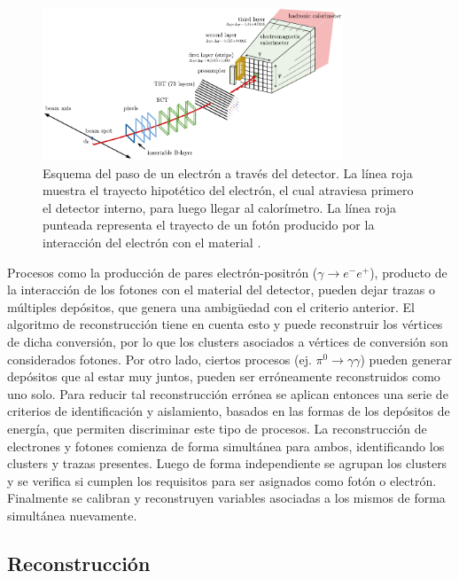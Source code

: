  \begin{figure}
 \centering
   \includegraphics[width=0.8\textwidth]{images/objects/el_reco.pdf}
   \caption{Esquema del paso de un electrón a través del detector. La línea roja muestra el trayecto hipotético del electrón, el cual atraviesa primero el detector interno, para luego llegar al calorímetro. La línea roja punteada representa el trayecto de un fotón producido por la interacción del electrón con el material \cite{PERF-2017-01}.}
   \label{fig:el_reco}
 \end{figure}


Procesos como la producción de pares electrón-positrón ($\gamma\to e^{-}e^{+}$), producto de la interacción de los fotones con el material del detector, pueden dejar trazas o múltiples depósitos, que genera una ambigüedad con el criterio anterior.
El algoritmo de reconstrucción tiene en cuenta esto y puede reconstruir los vértices de dicha conversión, por lo que los clusters asociados a vértices de conversión son considerados fotones. Por otro lado, ciertos procesos (ej. $\pi^{0}\to\gamma\gamma$) pueden generar depósitos que al estar muy juntos, pueden ser erróneamente reconstruidos como uno solo.
Para reducir tal reconstrucción errónea se aplican entonces una serie de criterios de identificación y aislamiento, basados en las formas de los depósitos de energía, que permiten discriminar este tipo de procesos.
La reconstrucción de electrones y fotones comienza de forma simultánea para ambos, identificando los clusters y trazas presentes. Luego de forma independiente se agrupan los clusters y se verifica si cumplen los requisitos para ser asignados como fotón o electrón. Finalmente se calibran y reconstruyen variables asociadas a los mismos de forma simultánea nuevamente.



\subsection{Reconstrucción}


